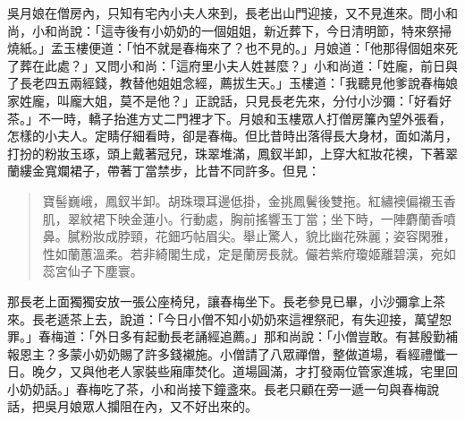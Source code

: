 吳月娘在僧房內，只知有宅內小夫人來到，長老出山門迎接，又不見進來。問小和尚，小和尚說：「這寺後有小奶奶的一個姐姐，新近葬下，今日清明節，特來祭掃燒紙。」孟玉樓便道：「怕不就是春梅來了？也不見的。」月娘道：「他那得個姐來死了葬在此處？」又問小和尚：「這府里小夫人姓甚麼？」小和尚道：「姓龐，前日與了長老四五兩經錢，教替他姐姐念經，薦拔生天。」玉樓道：「我聽見他爹說春梅娘家姓龐，叫龐大姐，莫不是他？」正說話，只見長老先來，分付小沙彌：「好看好茶。」不一時，轎子抬進方丈二門裡才下。月娘和玉樓眾人打僧房簾內望外張看，怎樣的小夫人。定睛仔細看時，卻是春梅。但比昔時出落得長大身材，面如滿月，打扮的粉妝玉琢，頭上戴著冠兒，珠翠堆滿，鳳釵半卸，上穿大紅妝花襖，下著翠蘭縷金寬斕裙子，帶著丁當禁步，比昔不同許多。但見：
\begin{quote}
寶髻巍峨，鳳釵半卸。胡珠環耳邊低掛，金挑鳳鬢後雙拖。紅繡襖偏襯玉香肌，翠紋裙下映金蓮小。行動處，胸前搖響玉丁當；坐下時，一陣麝蘭香噴鼻。膩粉妝成脖頸，花鈿巧帖眉尖。舉止驚人，貌比幽花殊麗；姿容閑雅，性如蘭蕙溫柔。若非綺閣生成，定是蘭房長就。儼若紫府瓊姬離碧漢，宛如蕊宮仙子下塵寰。
\end{quote}

那長老上面獨獨安放一張公座椅兒，讓春梅坐下。長老參見已畢，小沙彌拿上茶來。長老遞茶上去，說道：「今日小僧不知小奶奶來這裡祭祀，有失迎接，萬望恕罪。」春梅道：「外日多有起動長老誦經追薦。」那和尚說：「小僧豈敢。有甚殷勤補報恩主？多蒙小奶奶賜了許多錢襯施。小僧請了八眾禪僧，整做道場，看經禮懺一日。晚夕，又與他老人家裝些廂庫焚化。道場圓滿，才打發兩位管家進城，宅里回小奶奶話。」春梅吃了茶，小和尚接下鐘盞來。長老只顧在旁一遞一句與春梅說話，把吳月娘眾人攔阻在內，又不好出來的。

